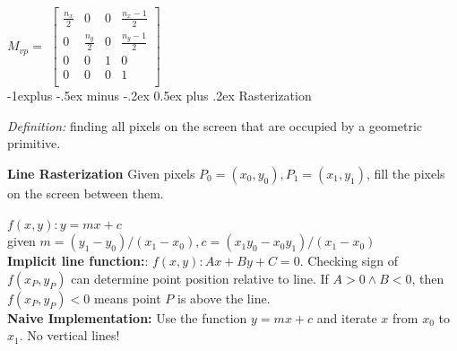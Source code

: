 \documentclass[letterpaper, 8pt]{extarticle}
\makeatletter
\renewcommand{\section}{\@startsection{section}{1}{0mm}%
                                {-1explus -.5ex minus -.2ex}%
                                {0.5ex plus .2ex}%
                                {\normalfont\small\bfseries}}
\makeatother
\begin{document}
\begin{multicols*}{4}
$M_{vp} = $
\(
\begin{bmatrix}
    \frac{n_x}{2} & 0             & 0 & \frac{n_x-1}{2} \\
    0             & \frac{n_y}{2} & 0 & \frac{n_y-1}{2} \\
    0             & 0             & 1 & 0               \\
    0             & 0             & 0 & 1               \\
\end{bmatrix}
\)\\



\section{Rasterization}

\textit{Definition:} finding all pixels on the screen that are occupied by a geometric primitive.

\textbf{Line Rasterization}
Given pixels $P_0 = (x_0, y_0), P_1 = (x_1, y_1)$, fill the pixels on the screen between them.

$f(x, y): y = mx + c$\\given $m=(y_1 - y_0)/(x_1 - x_0), c=(x_1y_0 - x_0y_1)/(x_1 - x_0)$\\
\textbf{Implicit line function:}: $f(x,y): Ax + By + C = 0$. Checking sign of $f(x_P, y_P)$ can determine point position relative to line. If $A>0 \land B<0$, then $f(x_P, y_P) < 0$ means point $P$ is above the line.\\

\textbf{Naive Implementation:} Use the function $y=mx+c$ and iterate $x$ from $x_0$ to $x_1$. No vertical lines!\\




\end{multicols*}
\end{document}
